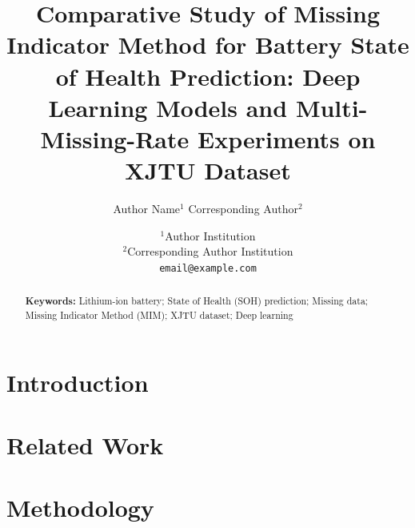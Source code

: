 \documentclass[10pt,a4paper]{article}
\title{\textbf{Comparative Study of Missing Indicator Method for Battery State of Health Prediction: Deep Learning Models and Multi-Missing-Rate Experiments on XJTU Dataset}}
\author{Author Name$^{1}$ \quad Corresponding Author$^{2}$}
\date{$^{1}$Author Institution \\ $^{2}$Corresponding Author Institution \\ \texttt{email@example.com}}
\begin{document}
\maketitle

\begin{abstract}

\textbf{Keywords:} Lithium-ion battery; State of Health (SOH) prediction; Missing data; Missing Indicator Method (MIM); XJTU dataset; Deep learning
\end{abstract}

\section{Introduction}\label{sec:intro}

\section{Related Work}\label{sec:related}

\section{Methodology}\label{sec:method}
\end{document}
